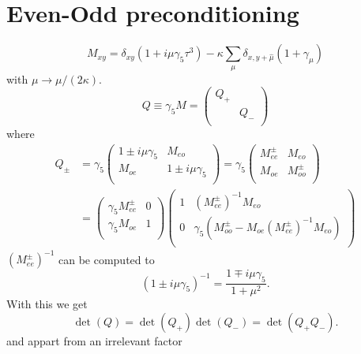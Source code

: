 \section*{Even-Odd preconditioning}

\begin{equation}
  \label{eq:eo0}
  M_{xy} =\delta_{xy}(1+i\mu\gamma_5\tau^3) - \kappa\sum_\mu \delta_{x,y+\hat\mu}(1+\gamma_\mu) 
\end{equation}
with $\mu \to \mu/(2\kappa)$.
\begin{equation}
  \label{eq:eo1}
  Q\equiv \gamma_5 M = \begin{pmatrix}
      Q_+ & \\\
         & Q_- \\
      \end{pmatrix}
\end{equation}
where
\begin{equation}
  \label{eq:eo2}
  \begin{split}
    Q_\pm &= \gamma_5\begin{pmatrix}
      1\pm i\mu\gamma_5 & M_{eo} \\
      M_{oe}    & 1\pm i\mu\gamma_5 \\
    \end{pmatrix} =
    \gamma_5\begin{pmatrix}
      M_{ee}^\pm & M_{eo} \\
      M_{oe}    & M_{oo}^\pm \\
    \end{pmatrix} \\
    & =
    \begin{pmatrix}
      \gamma_5M_{ee}^\pm & 0 \\
      \gamma_5M_{oe}  & 1 \\
    \end{pmatrix}
    \begin{pmatrix}
      1       & (M_{ee}^\pm)^{-1}M_{eo}\\
      0       & \gamma_5(M_{oo}^\pm-M_{oe}(M_{ee}^\pm)^{-1}M_{eo})\\
    \end{pmatrix}
\end{split}
\end{equation}
$(M_{ee}^\pm)^{-1}$ can be computed to 
\[
(1\pm i\mu\gamma_5)^{-1} = \frac{1\mp i\mu\gamma_5}{1+\mu^2}.
\]
With this we get
\begin{equation}
  \label{eq:eo3}
  \det(Q)=\det(Q_+)\det(Q_-) = \det(Q_+ Q_-).
\end{equation}
and appart from an irrelevant factor
